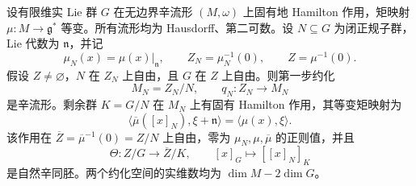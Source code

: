 \begin{theorem}\label{g4:thm:1003:reduction-stages}
	设有限维实 Lie 群 \(G\) 在无边界辛流形 \((M,\omega)\) 上固有地 Hamilton 作用，矩映射 \(\mu:M\to\mathfrak g^*\) 等变。所有流形均为 Hausdorff、第二可数。设 \(N\subseteq G\) 为闭正规子群，Lie 代数为 \(\mathfrak n\)，并记
	\[
		\mu_N(x)=\mu(x)|_{\mathfrak n},\qquad
		Z_N=\mu_N^{-1}(0),\qquad Z=\mu^{-1}(0).
	\]
	假设 \(Z\ne\varnothing\)，\(N\) 在 \(Z_N\) 上自由，且 \(G\) 在 \(Z\) 上自由。则第一步约化
	\[
		M_N=Z_N/N,\qquad q_N:Z_N\to M_N
	\]
	是辛流形。剩余群 \(K=G/N\) 在 \(M_N\) 上有固有 Hamilton 作用，其等变矩映射为
	\begin{equation}\label{g4:eq:1003:residual-moment}
		\langle\overline\mu([x]_N),\xi+\mathfrak n\rangle
		=\langle\mu(x),\xi\rangle.
	\end{equation}
	该作用在 \(\overline Z=\overline\mu^{-1}(0)=Z/N\) 上自由，零为 \(\mu_N,\mu,\overline\mu\) 的正则值，并且
	\begin{equation}\label{g4:eq:1003:stages-map}
		\Theta:Z/G\longrightarrow\overline Z/K,
		\qquad [x]_G\longmapsto[[x]_N]_K
	\end{equation}
	是自然辛同胚。两个约化空间的实维数均为 \(\dim M-2\dim G\)。
\end{theorem}
